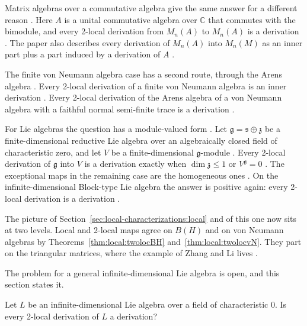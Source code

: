 Matrix algebras over a commutative algebra give the same answer for a different
reason \cite[p.~9]{HuangLiQian2018Matrix}. Here $A$ is a unital commutative
algebra over $\mathbb{C}$ that commutes with the bimodule, and every 2-local
derivation from $M_n(A)$ to $M_n(A)$ is a derivation
\cite[Theorem~3.6, p.~10]{HuangLiQian2018Matrix}. The paper also describes
every derivation of $M_n(A)$ into $M_n(M)$ as an inner part plus a part induced
by a derivation of $A$ \cite[Theorem~2.1, p.~4]{HuangLiQian2018Matrix}.

The finite von Neumann algebra case has a second route, through the Arens
algebra \cite[Theorem~3.4, p.~11]{AyupovKudaybergenovNurjanovAlauatdinov2011}.
Every 2-local derivation of a finite von Neumann algebra is an inner derivation
\cite[Theorem~3.4, p.~11]{AyupovKudaybergenovNurjanovAlauatdinov2011}. Every
2-local derivation of the Arens algebra of a von Neumann algebra with a
faithful normal semi-finite trace is a derivation
\cite[Theorem~3.2, p.~9]{AyupovKudaybergenovNurjanovAlauatdinov2011}.

For Lie algebras the question has a module-valued form
\cite[p.~1]{ChenLuoXu2026}. Let $\mathfrak{g}=\mathfrak{s}\oplus
\mathfrak{z}$ be a finite-dimensional reductive Lie algebra over an
algebraically closed field of characteristic zero, and let $V$ be a
finite-dimensional $\mathfrak{g}$-module
\cite[p.~1]{ChenLuoXu2026}. Every 2-local derivation of
$\mathfrak{g}$ into $V$ is a derivation exactly when $\dim\mathfrak{z}\leq1$ or
$V^{\mathfrak{g}}=0$ \cite[Corollary~1.3, p.~2]{ChenLuoXu2026}. The
exceptional maps in the remaining case are the homogeneous ones
\cite[Theorem~1.2, p.~2]{ChenLuoXu2026}. On the infinite-dimensional
Block-type Lie algebra the answer is positive again: every 2-local derivation is
a derivation \cite[Theorem~3.6, p.~9]{ChenGuo2026}.

The picture of
Section~\ref{sec:local-characterizations:local} and of this one now
sits at two levels.
Local and 2-local maps agree on $B(H)$ and on von
Neumann algebras by Theorems~\ref{thm:local:twolocBH}
and~\ref{thm:local:twolocvN}. They part on the triangular matrices, where
the example of Zhang and Li lives \cite[p.~15]{AyupovKudaybergenov2012}.

The problem for a general infinite-dimensional Lie algebra is open, and this
section states it. %

\begin{problem}\label{prob:open:twolocal}
Let $L$ be an infinite-dimensional Lie algebra over a field of characteristic
$0$.
Is every 2-local derivation of $L$ a derivation?
\end{problem}

